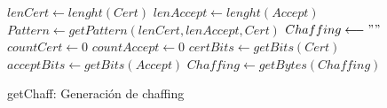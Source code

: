 \documentclass[12pt, a4paper, titlepage]{report}
\begin{document}
                \newpage
                
                \begin{algorithm}[H]
                    \SetAlgoLined
                    $lenCert \longleftarrow lenght(Cert)$\;
                    $lenAccept \longleftarrow lenght(Accept)$\;
                    $Pattern \longleftarrow getPattern(lenCert, lenAccept, Cert)$\;
                    $Chaffing \longleftarrow " "$\;
                    $countCert \longleftarrow 0$\;
                    $countAccept \longleftarrow 0$\;
                    $certBits \longleftarrow getBits(Cert)$\;
                    $acceptBits \longleftarrow getBits(Accept)$\;
                    $Chaffing \longleftarrow getBytes(Chaffing)$\;
                    \caption{getChaff: Generación de chaffing}
                \end{algorithm}
                
\end{document}
